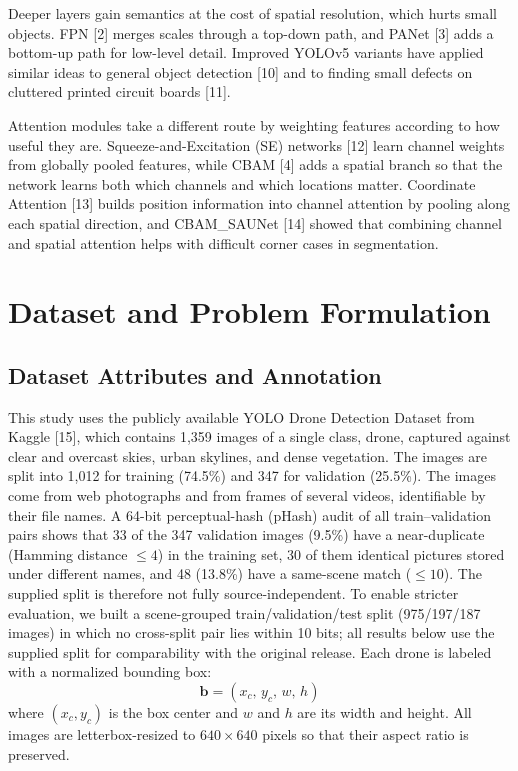 \documentclass[conference]{IEEEtran}
\begin{document}
Deeper layers gain semantics at the cost of spatial resolution, which hurts small objects. FPN [2] merges scales through a top-down path, and PANet [3] adds a bottom-up path for low-level detail. Improved YOLOv5 variants have applied similar ideas to general object detection [10] and to finding small defects on cluttered printed circuit boards [11].

Attention modules take a different route by weighting features according to how useful they are. Squeeze-and-Excitation (SE) networks [12] learn channel weights from globally pooled features, while CBAM [4] adds a spatial branch so that the network learns both which channels and which locations matter. Coordinate Attention [13] builds position information into channel attention by pooling along each spatial direction, and CBAM\_SAUNet [14] showed that combining channel and spatial attention helps with difficult corner cases in segmentation.

\section{Dataset and Problem Formulation}

\subsection{Dataset Attributes and Annotation}

This study uses the publicly available YOLO Drone Detection Dataset from Kaggle [15], which contains 1,359 images of a single class, drone, captured against clear and overcast skies, urban skylines, and dense vegetation. The images are split into 1,012 for training (74.5\%) and 347 for validation (25.5\%). The images come from web photographs and from frames of several videos, identifiable by their file names. A 64-bit perceptual-hash (pHash) audit of all train--validation pairs shows that 33 of the 347 validation images (9.5\%) have a near-duplicate (Hamming distance $\leq4$) in the training set, 30 of them identical pictures stored under different names, and 48 (13.8\%) have a same-scene match ($\leq10$). The supplied split is therefore not fully source-independent. To enable stricter evaluation, we built a scene-grouped train/validation/test split (975/197/187 images) in which no cross-split pair lies within 10 bits; all results below use the supplied split for comparability with the original release. Each drone is labeled with a normalized bounding box:
\begin{equation}
\mathbf{b} = (x_c,\, y_c,\, w,\, h)
\end{equation}
where $(x_c, y_c)$ is the box center and $w$ and $h$ are its width and height. All images are letterbox-resized to $640\times640$ pixels so that their aspect ratio is preserved.
\end{document}
